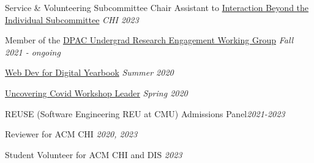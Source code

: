 \documentclass{resume}
\begin{document}
\begin{rSection}{Service \& Volunteering} 
{Subcommittee Chair Assistant to \href{https://chi2023.acm.org/subcommittees/selecting-a-subcommittee/}{Interaction Beyond the Individual Subcommittee}} \hfill{\em CHI 2023} 

{Member of the \href{https://scs-phd-deans-committee.github.io/working-groups}{DPAC Undergrad Research Engagement Working Group}} \hfill{\em Fall 2021 - ongoing} 

{\href{https://www.oc2020.oberlincollegelibrary.org/}{Web Dev for Digital Yearbook}} \hfill{\em Summer 2020} 


{\href{https://advance.oberlin.edu/events/2020/10/13/uncovering-covid-19-critical-liberal-arts-perspectives-lecture-series}{Uncovering Covid Workshop Leader}} \hfill{\em Spring 2020}

{REUSE (Software Engineering REU at CMU) Admissions Panel}\hfill{\em 2021-2023}	

{Reviewer for ACM CHI} \hfill {\em 2020, 2023}

{Student Volunteer for ACM CHI and DIS} \hfill {\em 2023}








\end{rSection}
\end{document}

